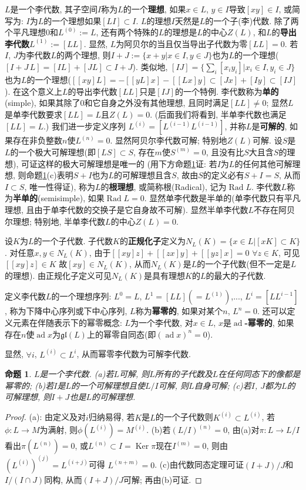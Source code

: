 \documentclass{ctexart}%
\newtheorem{proposition}{命题}
\theoremstyle{definition}
\theoremstyle{remark}
\DeclareMathOperator{\ad}{ad}
\DeclareMathOperator{\Rad}{Rad}
\DeclareMathOperator{\Ker}{Ker}
\begin{document}
$L$是一个李代数, 其子空间$I$称为$L$的一个\textbf{理想}, 如果$x\in L$, $y\in I$导致$[xy]\in I$, 或简写为: $I$为$L$的一个理想如果$[LI]\subset I$. $L$的理想$I$天然是$L$的一个子(李)代数. 除了两个平凡理想$0$和$L^{(0)}:=L$, 还有两个特殊的$L$的理想是$L$的中心$Z(L)$, 和$L$的\textbf{导出李代数}$L^{(1)}:=[LL]$. 显然, $L$为阿贝尔的当且仅当导出子代数为零$[LL]=0$. 若$I$, $J$为李代数$L$的两个理想, 则$I+J:=\{x+y|x\in I, y\in J\}$也为$L$的一个理想($[I+J\,L]=[IL]+[JL]\subset I+J$). 类似地, $[IJ]=\{\sum_i [x_iy_i]|x_i\in I, y_i \in J\}$也为$L$的一个理想($[[xy]L]=-[[yL]x]-[[Lx]y]\subset[Jx]+[Iy]\subset [IJ]$). 在这个意义上$L$的导出李代数$[LL]$只是$[IJ]$的一个特例. 李代数称为\textbf{单的}(simple), 如果其除了$0$和它自身之外没有其他理想, 且同时满足$[LL]\neq0$; 显然$L$是单李代数要求$[LL]=L$且$Z(L)=0$. (后面我们将看到, 半单李代数也满足$[LL]=L$.) 我们进一步定义序列 $L^{(i)}=[L^{(i-1)}L^{(i-1)}]$, 并称$L$是\textbf{可解的}, 如果存在非负整数$n$使$L^{(n)}=0$. 显然阿贝尔李代数可解; 特别地$Z(L)$可解. 设$S$是$L$的一个极大可解理想(即$[LS]\subset S$, 存在$m$使$S^{(m)}=0$, 且没有比$S$大且含$S$的理想), 可证这样的极大可解理想是唯一的 (用下方命题\ref{3.1}证: 若$I$为$L$的任何其他可解理想, 则命题\ref{3.1}(c)表明$S+I$也为$L$的可解理想且含$S$, 故由$S$的定义必有$S+I=S$, 从而$I\subset S$, 唯一性得证), 称为$L$的\textbf{根理想}, 或简称根(Radical), 记为$\Rad  L$. 李代数$L$称为\textbf{半单的}(semisimple), 如果$\Rad L=0$. 显然单李代数是半单的(单李代数只有平凡理想, 且由于单李代数的交换子是它自身故不可解). 显然半单李代数$L$不存在阿贝尔理想; 特别地, 半单李代数$L$的中心$Z(L)=0$. 



设$K$为$L$的一个子代数. 子代数$K$的\textbf{正规化子}定义为$N_L(K)=\{x\in L|[xK]\subset K\}$. 对任意$x,y\in N_L(K)$, 由于$[[xy]z]+[[zx]y]+[[yz]x]=0$ $\forall z \in K$, 可见$[[xy]z]\in K$ 故$[xy]\in N_L(K)$, 从而$N_L(K)$是$L$的一个子代数(但不一定是$L$的理想). 由正规化子定义可见$N_L(K)$是具有理想$K$的$L$的最大的子代数.


定义李代数$L$的一个理想序列: $L^0=L$, $L^1=[LL](=L^{(1)})$,..., $L^i=[LL^{i-1}]$, 称为下降中心序列或下中心序列, $L$称为\textbf{幂零的}, 如果对某个$n$, $L^n=0$. 还可以定义元素在伴随表示下的幂零概念: $L$为一个李代数, 对$x\in L$, $x$是\textbf{$\ad$-幂零的}, 如果存在$n$使$\ad x$为$\mathfrak{gl}(L)$上的幂零自同态(即$(\ad x)^n=0$). 

显然, $\forall i$, $L^{(i)}\subset L^i$, 从而幂零李代数为可解李代数.

\begin{proposition}\label{3.1}$L$是一个李代数. (a)若$L$可解, 则$L$所有的子代数及$L$在任何同态下的像都是幂零的; (b)若$I$是$L$的一个可解理想且使$L/I$可解, 则$L$自身可解; (c)若$I$, $J$都为$L$的可解理想, 则$I+J$也是$L$的可解理想.
\end{proposition}
\begin{proof}
(a): 由定义及对$i$归纳易得, 若$K$是$L$的一个子代数则$K^{(i)}\subset L^{(i)}$, 若$\phi\colon L\rightarrow M$为满射, 则$\phi(L^{(i)})= M^{(i)}$. (b)若$(L/I)^{(n)}=0$, 由(a)对$\pi\colon L\rightarrow L/I$看出$\pi(L^{(n)})=0$, 或$L^{(n)}\subset I=\Ker \pi$现在$I^{(m)}=0$, 则由$(L^{(i)})^{(j)}= L^{(i+j)}$可得 $L^{(n+m)}=0$. (c)由代数同态定理可证$(I+J)/J$和$I/(I\cap J)$同构, 从而$(I+J)/J$可解; 再由(b)可证.
\end{proof}
\end{document}
